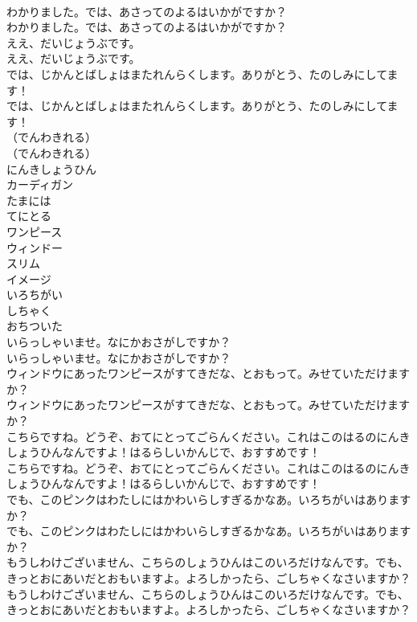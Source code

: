 \documentclass[8pt]{extreport}
\begin{document}
\begin{CJK}{UTF8}{min}
\\	わかりました。では、あさってのよるはいかがですか？
\\	わかりました。では、あさってのよるはいかがですか？
\\	ええ、だいじょうぶです。
\\	ええ、だいじょうぶです。
\\	では、じかんとばしょはまたれんらくします。ありがとう、たのしみにしてます！
\\	では、じかんとばしょはまたれんらくします。ありがとう、たのしみにしてます！
\\	（でんわきれる）
\\	（でんわきれる）
\\	にんきしょうひん
\\	カーディガン
\\	たまには
\\	てにとる
\\	ワンピース
\\	ウィンドー
\\	スリム
\\	イメージ
\\	いろちがい
\\	しちゃく
\\	おちついた
\\	いらっしゃいませ。なにかおさがしですか？
\\	いらっしゃいませ。なにかおさがしですか？
\\	ウィンドウにあったワンピースがすてきだな、とおもって。みせていただけますか？
\\	ウィンドウにあったワンピースがすてきだな、とおもって。みせていただけますか？
\\	こちらですね。どうぞ、おてにとってごらんください。これはこのはるのにんきしょうひんなんですよ！はるらしいかんじで、おすすめです！
\\	こちらですね。どうぞ、おてにとってごらんください。これはこのはるのにんきしょうひんなんですよ！はるらしいかんじで、おすすめです！
\\	でも、このピンクはわたしにはかわいらしすぎるかなあ。いろちがいはありますか？
\\	でも、このピンクはわたしにはかわいらしすぎるかなあ。いろちがいはありますか？
\\	もうしわけございません、こちらのしょうひんはこのいろだけなんです。でも、きっとおにあいだとおもいますよ。よろしかったら、ごしちゃくなさいますか？
\\	もうしわけございません、こちらのしょうひんはこのいろだけなんです。でも、きっとおにあいだとおもいますよ。よろしかったら、ごしちゃくなさいますか？

\end{CJK}
\end{document}
